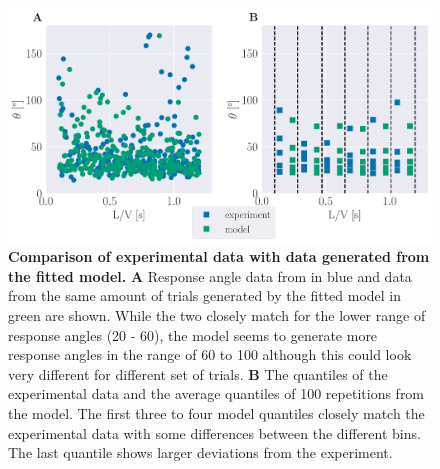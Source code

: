     \begin{figure}[H]
    \begin{center}
    \includegraphics[width=\textwidth]{figure_expm_fit_comparison.pdf}
    \end{center}
    \caption{\textbf{Comparison of experimental data with data generated from the fitted model.} \textbf{A} Response angle data from \cite{Bhattacharyya2017} in blue and data from the same amount of trials generated by the fitted model in green are shown. While the two closely match for the lower range of response angles (20\textdegree{} - 60\textdegree{}), the model seems to generate more response angles in the range of 60\textdegree{} to 100\textdegree{} although this could look very different for different set of trials. \textbf{B} The quantiles of the experimental data and the average quantiles of 100 repetitions from the model. The first three to four model quantiles closely match the experimental data with some differences between the different bins. The last quantile shows larger deviations from the experiment.}
    \label{fig:fit_expm_comparison}
    \end{figure}
